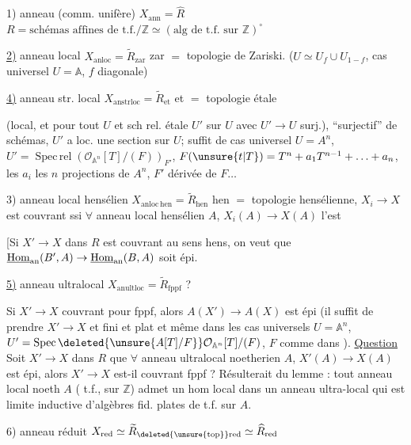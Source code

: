 
1) anneau (comm. unifère) \quad $X_{\mathrm{ann}}=\widehat R$\quad
$R=\text{schémas affines de t.f.}/\mathbb Z\simeq(\text{alg de t.f. sur }\mathbb Z)^\circ$

\uline{2)} anneau local \quad $X_{\mathrm{anloc}}=\widetilde R_{\mathrm{zar}}$ \quad zar $=$ topologie de Zariski.
($U\simeq U_f\cup U_{1-f}$, cas universel $U=\mathbb A$, $f$ diagonale)

\uline{4)} anneau str. local \quad $X_{\mathrm{anstrloc}}=\widetilde R_{\mathrm{et}}$ \quad et $=$ topologie étale

(local, et pour tout $U$ et sch rel. étale $U'$ sur $U$ avec $U'\to U$  surj.),
``surjectif'' de schémas,  $U'$ a loc. une section sur $U$;
suffit de cas universel $U=A^n$, $U'=\operatorname{Spec\,rel}(\mathcal O_{\mathbb A^n}[T]/(F))_{F'}$,
$F(\unsure{t|T})=T^n+a_1T^{n-1}+\ldots+a_n$, les $a_i$ les $n$ projections de $A^n$, $F'$ dérivée de $F\ldots$

3) anneau local hensélien \quad $X_{\mathrm{anloc\,hen}}=\widetilde R_{\mathrm{hen}}$ \quad hen $=$ topologie hensélienne,
$X_i\to X$ est couvrant ssi $\forall$ anneau local hensélien $A$, $X_i(A)\to X(A)$ l'est

[Si $X'\to X$ dans $R$ est couvrant  au sens hens, on veut que
$\underline{\operatorname{Hom}}_{\rm an}(B',A)\to\underline{\operatorname{Hom}}_{\rm an}(B,A)$ soit épi.

\uline{5)} anneau ultralocal \quad $X_{\mathrm{anultloc}}=\widetilde R_{\mathrm{fppf}}$ \quad ?

Si $X'\to X$  couvrant pour fppf,
alors $A(X')\to A(X)$ est épi (il suffit de prendre $X'\to X$  et  fini et plat
et même dans les cas universels $U=\mathbb A^n$, $U'=\operatorname{Spec}\deleted{\unsure{A[T]/F}}\mathcal O_{\mathbb A^n}[T]/(F)$, $F$ comme dans ).
\uline{Question} Soit $X'\to X$ dans $R$  que $\forall$ anneau ultralocal noetherien $A$,
$X'(A)\to X(A)$ est épi, alors $X'\to X$ est-il couvrant fppf ? Résulterait du lemme : tout anneau local noeth $A$
( t.f., sur $\mathbb Z$) admet un hom local dans un anneau ultra-local qui est limite inductive d'algèbres fid. plates de t.f. sur $A$.

6) anneau réduit \quad $X_{\rm red}\simeq\widetilde R_{\deleted{\unsure{\rm top}}\rm red}\simeq\widehat R_{\rm red}$

